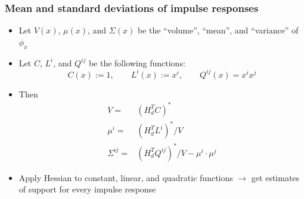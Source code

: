 \documentclass[10pt,final,xcolor=dvipsnames]{beamer}
\begin{document}
\begin{frame}
	\frametitle{Mean and standard deviations of impulse responses}
	\begin{itemize}
		\setlength\itemsep{2em}
		\item Let $V(x)$, $\mu(x)$, and $\Sigma(x)$ be the ``volume'', ``mean'', and ``variance'' of $\phi_x$
		\item Let $C$, $L^i$, and $Q^{ij}$ be the following functions:
		\begin{equation*}
		C(x) := 1, \qquad
		L^i(x) := x^i, \qquad
		Q^{ij}(x) = x^i x^j
		\end{equation*}
		\item Then
		\begin{align*}
		V =& \left(H_d^T C\right)^* \\
		\mu^i =& \left(H_d^T L^i\right)^* / V \\
		\Sigma^{ij} =& \left(H_d^T Q^{ij}\right)^* / V - \mu^i\cdot \mu^j
		\end{align*}
		\item Apply Hessian to constant, linear, and quadratic functions $\rightarrow$ get estimates of support for every impulse response
	\end{itemize}
	
\end{frame}
\end{document}
